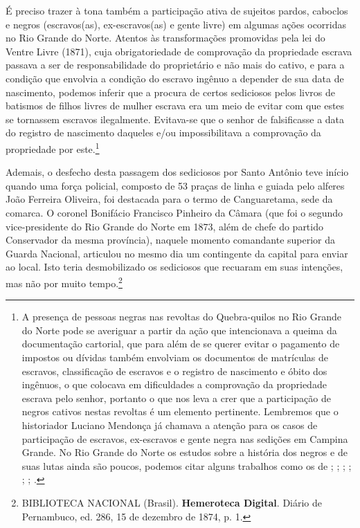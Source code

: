 \begin{refsection}
É preciso trazer à tona também a participação ativa de sujeitos pardos, caboclos e negros (escravos(as), ex-escravos(as) e gente livre) em algumas ações ocorridas no Rio Grande do Norte. Atentos às transformações promovidas pela lei do Ventre Livre (1871), cuja obrigatoriedade de comprovação da propriedade escrava passava a ser de responsabilidade do proprietário e não mais do cativo, e para a condição que envolvia a condição do escravo ingênuo a depender de sua data de nascimento, podemos inferir que a procura de certos sediciosos pelos livros de batismos de filhos livres de mulher escrava era um meio de evitar com que estes se tornassem escravos ilegalmente. Evitava-se que o senhor de falsificasse a data do registro de nascimento daqueles e/ou impossibilitava a comprovação da propriedade por este.\footnote{A presença de pessoas negras nas revoltas do Quebra-quilos no Rio Grande do Norte pode se averiguar a partir da ação que intencionava a queima da documentação cartorial, que para além de se querer evitar o pagamento de impostos ou dívidas também envolviam os documentos de matrículas de escravos, classificação de escravos e o registro de nascimento e óbito dos ingênuos, o que colocava em dificuldades a comprovação da propriedade escrava pelo senhor, portanto o que nos leva a crer que a participação de negros cativos nestas revoltas é um elemento pertinente. Lembremos que o historiador Luciano Mendonça já chamava a atenção para os casos de participação de escravos, ex-escravos e gente negra nas sedições em Campina Grande. No Rio Grande do Norte os estudos sobre a história dos negros e de suas lutas ainda são poucos, podemos citar alguns trabalhos como os de ; ; ; ; ; ; .}

Ademais, o desfecho desta passagem dos sediciosos por Santo Antônio teve início quando uma força policial, composto de 53 praças de linha e guiada pelo alferes João Ferreira Oliveira, foi destacada para o termo de Canguaretama, sede da comarca. O coronel Bonifácio Francisco Pinheiro da Câmara (que foi o segundo vice-presidente do Rio Grande do Norte em 1873, além de chefe do partido Conservador da mesma província), naquele momento comandante superior da Guarda Nacional, articulou no mesmo dia um contingente da capital para enviar ao local. Isto teria desmobilizado os sediciosos que recuaram em suas intenções, mas não por muito tempo.\footnote{BIBLIOTECA NACIONAL (Brasil). \textbf{Hemeroteca Digital}. Diário de Pernambuco, ed. 286, 15 de dezembro de 1874, p. 1.}


\end{refsection}
